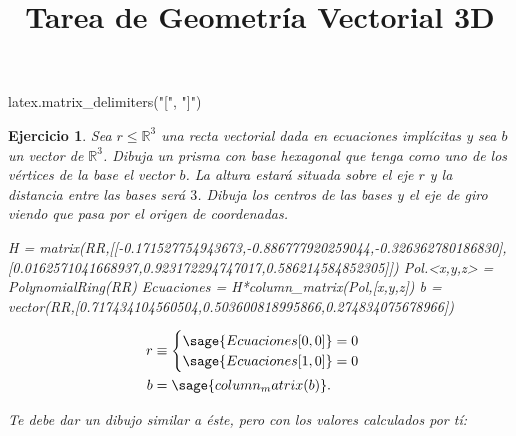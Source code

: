 \documentclass{amsart}
\title{Tarea de Geometría Vectorial 3D}
\newtheorem{ejer}{Ejercicio}
\def\r{\mathbb{R}}
\begin{document}
\begin{sagecode}
latex.matrix_delimiters("[", "]")
\end{sagecode}

\maketitle

\begin{ejer}
Sea $r \leq \r^3$ una recta vectorial dada en ecuaciones implícitas
y sea $b$ un vector de $\r^3$. Dibuja un prisma con base hexagonal
que tenga como uno de los vértices de la base el vector $b$. La altura
estará situada sobre el eje $r$ y la distancia entre las bases será $3$. 
Dibuja los centros de las bases y el eje de giro viendo que pasa por el origen 
de coordenadas.

\begin{tcolorbox}[title = Datos]
\begin{sageblock}
H = matrix(RR,[[-0.171527754943673,-0.886777920259044,-0.326362780186830],
[0.0162571041668937,0.923172294747017,0.586214584852305]])
Pol.<x,y,z> = PolynomialRing(RR)
Ecuaciones = H*column_matrix(Pol,[x,y,z])
b = vector(RR,[0.717434104560504,0.503600818995866,0.274834075678966])
\end{sageblock}

\begin{align*}
r &\equiv \begin{cases} 
  \sage{Ecuaciones[0,0]} = 0 \\
  \sage{Ecuaciones[1,0]} = 0 \\
  \end{cases} \\
b &= \sage{column_matrix(b)}.
\end{align*}
\end{tcolorbox}

Te debe dar un dibujo similar a éste, pero con los valores calculados por tí:


\end{ejer}
\end{document}
